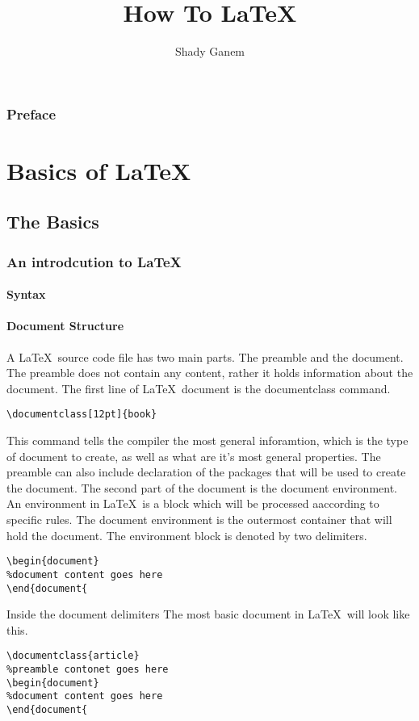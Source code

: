 \documentclass[12pt]{book}
\title{How To \LaTeX}
\author{Shady Ganem}
\begin{document}
\maketitle
\section*{Preface}
\tableofcontents
\newpage
\part{Basics of \LaTeX}
\chapter{The Basics}
\newpage
\section{An introdcution to \LaTeX \ }
\subsection{Syntax}
\subsection{Document Structure}
A \LaTeX \ source code file has two main parts. The preamble and the document.
The preamble does not contain any content, rather it holds information about the document. 
The first line of \LaTeX \ document is the documentclass command. 
\begin{lstlisting}[language={[LaTeX]TeX}]
\documentclass[12pt]{book}
\end{lstlisting}
This command tells the compiler the most general inforamtion, which is the type of
document to create, as well as what are it's most general properties.
The preamble can also include declaration of the packages that will be used to create the document.
\newline
The second part of the document is the document environment. An environment in \LaTeX \ is a block which will be processed aaccording to specific rules. 
\newline The document environment is the outermost container that will hold the
document. The environment block is denoted by two delimiters.
\begin{lstlisting}[language={[LaTeX]TeX}]
\begin{document}
%document content goes here
\end{document{
\end{lstlisting}
Inside the document delimiters 
The most basic document in \LaTeX \ will look like this.
\begin{lstlisting}[language={[LaTeX]TeX}]
\documentclass{article}
%preamble contonet goes here
\begin{document}
%document content goes here
\end{document{
\end{lstlisting}
\newpage
\end{document}

